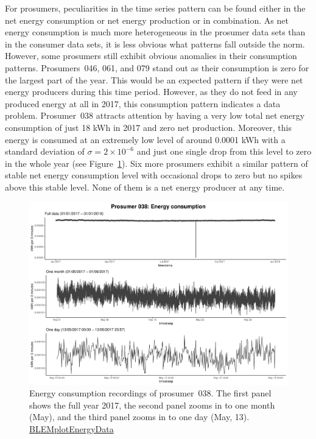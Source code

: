 For prosumers, peculiarities in the time series pattern can be found either in the net energy consumption or net energy production or in combination. As net energy consumption is much more heterogeneous in the prosumer data sets than in the consumer data sets, it is less obvious what patterns fall outside the norm. However, some prosumers still exhibit obvious anomalies in their consumption patterns. Prosumers~046, 061, and 079 stand out as their consumption is zero for the largest part of the year. This would be an expected pattern if they were net energy producers during this time period. However, as they do not feed in any produced energy at all in 2017, this consumption pattern indicates a data problem. Prosumer~038 attracts attention by having a very low total net energy consumption of just 18 kWh in 2017 and zero net production. Moreover, this energy is consumed at an extremely low level of around 0.0001 kWh with a standard deviation of $\sigma=2\times10^{-6}$ and just one single drop from this level to zero in the whole year (see Figure~\ref{Fig:energycons_p038}). Six more prosumers exhibit a similar pattern of stable net energy consumption level with occasional drops to zero but no spikes above this stable level. None of them is a net energy producer at any time.

\begin{figure}[htbp]
 \centering
\includegraphics[width=\textwidth]{thesis/graphs/timeseries/p038_cons.pdf}
\caption[Energy consumption recordings of prosumer 038]{Energy consumption recordings of prosumer~038. The first panel shows the full year 2017, the second panel zooms in to one month (May), and the third panel zooms in to one day (May, 13). \quantnet\href{https://github.com/QuantLet/BLEM/tree/master/BLEMplotEnergyData}{BLEMplotEnergyData}}
\label{Fig:energycons_p038}
\end{figure}

